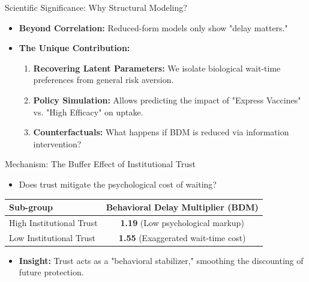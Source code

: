 \documentclass[10pt]{beamer}
\begin{document}
\begin{frame}{Scientific Significance: Why Structural Modeling?}
    \begin{itemize}
        \item \textbf{Beyond Correlation:} Reduced-form models only show "delay matters." 
        \item \textbf{The Unique Contribution:}
        \begin{enumerate}
            \item \textbf{Recovering Latent Parameters:} We isolate biological wait-time preferences from general risk aversion.
            \item \textbf{Policy Simulation:} Allows predicting the impact of "Express Vaccines" vs. "High Efficacy" on uptake.
            \item \textbf{Counterfactuals:} What happens if BDM is reduced via information intervention?
        \end{enumerate}
    \end{itemize}
\end{frame}

\begin{frame}{Mechanism: The Buffer Effect of Institutional Trust}
    \begin{itemize}
        \item Does trust mitigate the psychological cost of waiting?
    \end{itemize}
    \begin{table}[]
        \centering
        \begin{tabular}{lc}
            \hline
            \textbf{Sub-group} & \textbf{Behavioral Delay Multiplier (BDM)} \\ \hline
            High Institutional Trust & \textbf{1.19} (Low psychological markup) \\
            Low Institutional Trust & \textbf{1.55} (Exaggerated wait-time cost) \\ \hline
        \end{tabular}
    \end{table}
    \begin{itemize}
% 
\item \textbf{Insight:} Trust acts as a "behavioral stabilizer," smoothing the discounting of future protection.
    \end{itemize}
\end{frame}
\end{document}

